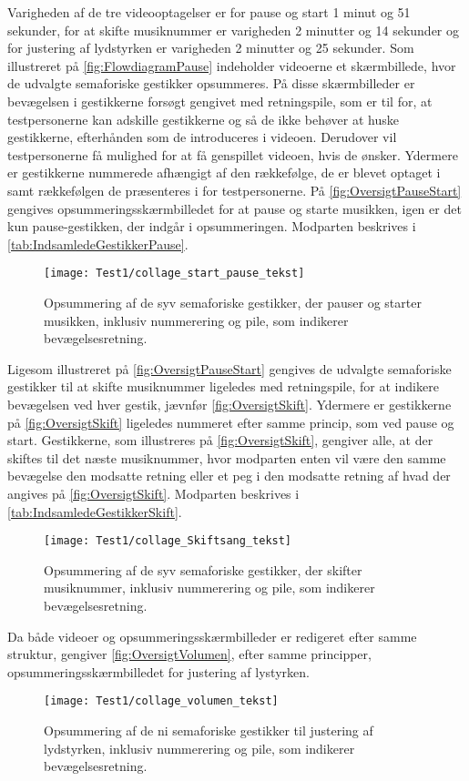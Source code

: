 Varigheden af de tre videooptagelser er for pause og start 1 minut og 51 sekunder, for at skifte musiknummer er varigheden 2 minutter og 14 sekunder og for justering af lydstyrken er varigheden 2 minutter og 25 sekunder.\blankline
%
Som illustreret på \autoref{fig:FlowdiagramPause} indeholder videoerne et skærmbillede, hvor de udvalgte semaforiske gestikker opsummeres. På disse skærmbilleder er bevægelsen i gestikkerne forsøgt gengivet med retningspile, som er til for, at testpersonerne kan adskille gestikkerne  og så de ikke behøver at huske gestikkerne, efterhånden som de introduceres i videoen. Derudover vil testpersonerne få mulighed for at få genspillet videoen, hvis de ønsker. Ydermere er gestikkerne nummerede afhængigt af den rækkefølge, de er blevet optaget i samt rækkefølgen de præsenteres i for testpersonerne. På \autoref{fig:OversigtPauseStart} gengives opsummeringsskærmbilledet for at pause og starte musikken, igen er det kun pause-gestikken, der indgår i opsummeringen. Modparten beskrives i \autoref{tab:IndsamledeGestikkerPause}.  
% 
\begin{figure}[H]
	\centering
	\texttt{[image: Test1/collage\_start\_pause\_tekst]}
	\caption{Opsummering af de syv semaforiske gestikker, der pauser og starter musikken, inklusiv nummerering og pile, som indikerer bevægelsesretning.}
	\label{fig:OversigtPauseStart}
\end{figure}
\noindent
%
Ligesom illustreret på \autoref{fig:OversigtPauseStart} gengives de udvalgte semaforiske gestikker til at skifte musiknummer ligeledes med retningspile, for at indikere bevægelsen ved hver gestik, jævnfør \autoref{fig:OversigtSkift}. Ydermere er gestikkerne på \autoref{fig:OversigtSkift} ligeledes nummeret efter samme princip, som ved pause og start. Gestikkerne, som illustreres på \autoref{fig:OversigtSkift}, gengiver alle, at der skiftes til det næste musiknummer, hvor modparten enten vil være den samme bevægelse den modsatte retning eller et peg i den modsatte retning af hvad der angives på \autoref{fig:OversigtSkift}. Modparten beskrives i \autoref{tab:IndsamledeGestikkerSkift}.
%
\begin{figure}[H]
	\centering
	\texttt{[image: Test1/collage\_Skiftsang\_tekst]}
	\caption{Opsummering af de syv semaforiske gestikker, der skifter musiknummer, inklusiv nummerering og pile, som indikerer bevægelsesretning.}
	\label{fig:OversigtSkift}
\end{figure}
\noindent
%
Da både videoer og opsummeringsskærmbilleder er redigeret efter samme struktur, gengiver \autoref{fig:OversigtVolumen}, efter samme principper, opsummeringsskærmbilledet for justering af lystyrken.  
%
\begin{figure}[H]
	\centering
	\texttt{[image: Test1/collage\_volumen\_tekst]}
	\caption{Opsummering af de ni semaforiske gestikker til justering af lydstyrken, inklusiv nummerering og pile, som indikerer bevægelsesretning.}
	\label{fig:OversigtVolumen}
\end{figure}
\noindent
%
